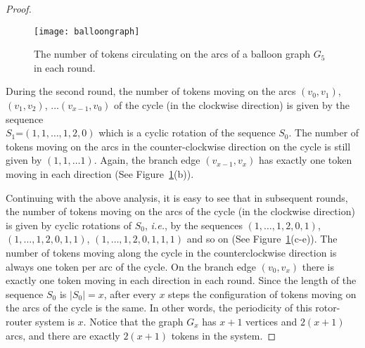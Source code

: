 \documentclass{article}[11pt,letter]
\newcommand{\ie}{{\it i.e.}\xspace}
\begin{document}
\begin{proof}
\begin{figure}[!h]
\texttt{[image: balloongraph]}
\caption{ \small{The number of tokens circulating on the arcs of a balloon graph $G_5$ in each round.}
} \label{fig:Periodballoon}
\end{figure}

During the second round, the number of tokens moving on the arcs $(v_0,v_1)$, $(v_1,v_2)$, $\dots (v_{x-1}, v_0)$ of the cycle (in the clockwise direction) is given by the sequence\\$S_1$=$(1,1,\dots,1,2,0)$ which is a cyclic rotation of the sequence $S_0$. The number of tokens moving on the arcs in the counter-clockwise direction on the cycle is still given by $(1,1,\dots 1)$. Again, the branch edge $(v_{x-1}, v_x)$ has exactly one token moving in each direction (See Figure~\ref{fig:Periodballoon}(b)).

Continuing with the above analysis, it is easy to see that in subsequent rounds, the number of tokens moving on the arcs of the cycle (in the clockwise direction) is given by cyclic rotations of $S_0$, \ie, by the sequences $(1,\dots,1,2,0,1)$, $(1,\dots,1,2,0,1,1)$, $(1,\dots,1,2,0,1,1,1)$ and so on (See Figure~\ref{fig:Periodballoon}(c-e)). The number of tokens moving along the cycle in the counterclockwise direction is always one token per arc of the cycle. On the branch edge $(v_0,v_x)$ there is exactly one token moving in each direction in each round. Since the length of the sequence $S_0$ is $|S_0|=x$, after every $x$ steps the configuration of tokens moving on the arcs of the cycle is the same. In other words,
the periodicity of this rotor-router system is $x$. Notice that the graph $G_x$ has $x+1$ vertices and $2(x+1)$ arcs, and there are exactly $2(x+1)$ tokens in the system.


\end{proof}
\end{document}
